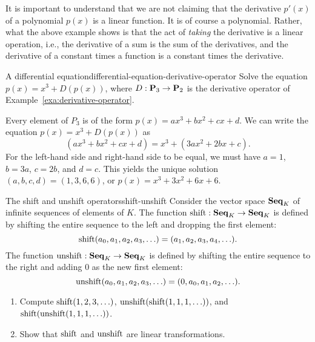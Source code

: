 It is important to understand that we are not claiming that the
derivative $p'(x)$ of a polynomial $p(x)$ is a linear function. It is
of course a polynomial. Rather, what the above example shows is that
the act of {\em taking} the derivative is a linear operation, i.e.,
the derivative of a sum is the sum of the derivatives, and the
derivative of a constant times a function is a constant times the
derivative.

\begin{example}{A differential equation}{differential-equation-derivative-operator}
  Solve the equation $p(x) = x^3 + D(p(x))$, where
  $D:\mathbf{P}_3\to\mathbf{P}_2$ is the derivative operator of
  Example~\ref{exa:derivative-operator}.
\end{example}

\begin{solution}
  Every element of $P_3$ is of the form $p(x) = ax^3 + bx^2 + cx + d$.
  We can write the equation $p(x) = x^3 + D(p(x))$ as
  \begin{equation*}
    (ax^3 + bx^2 + cx + d) = x^3 + (3ax^2 + 2bx + c).
  \end{equation*}
  For the left-hand side and right-hand side to be equal, we must have
  $a=1$, $b=3a$, $c=2b$, and $d=c$. This yields the unique solution
  $(a,b,c,d) = (1,3,6,6)$, or $p(x) = x^3+3x^2+6x+6$.
\end{solution}

\begin{example}{The shift and unshift operators}{shift-unshift}
  Consider the vector space $\mathbf{Seq}_K$ of infinite sequences of elements
  of $K$. The function $\shift:\Seq_K\to\Seq_K$ is defined by shifting
  the entire sequence to the left and dropping the first element:
  \begin{equation*}
    \shift(a_0,a_1,a_2,a_3,\ldots) = (a_1,a_2,a_3,a_4,\ldots).
  \end{equation*}
  The function $\unshift:\Seq_K\to\Seq_K$ is defined by shifting the
  entire sequence to the right and adding $0$ as the new first
  element:
  \begin{equation*}
    \unshift(a_0,a_1,a_2,a_3,\ldots) = (0,a_0,a_1,a_2,\ldots).
  \end{equation*}
  \begin{enumialphparenastyle}
    \begin{enumerate}
    \item Compute $\shift(1,2,3,\ldots)$,
      $\unshift(\shift(1,1,1,\ldots))$, and
      $\shift(\unshift(1,1,1,\ldots))$.
    \item Show that $\shift$ and $\unshift$ are linear transformations.
    \end{enumerate}
  \end{enumialphparenastyle}
\end{example}

